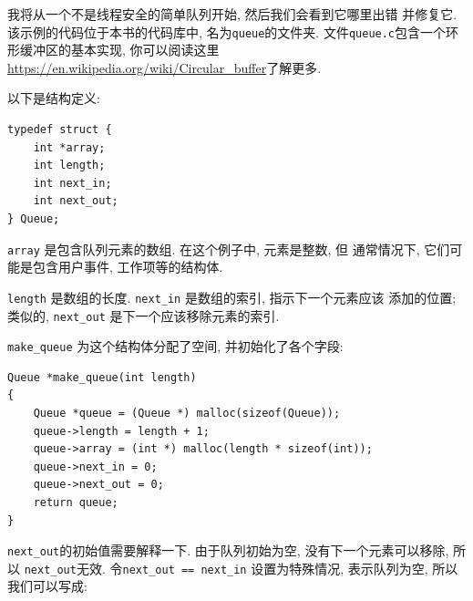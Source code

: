 \documentclass[12pt]{book}
\begin{document}
{我将从一个不是线程安全的简单队列开始, 然后我们会看到它哪里出错
并修复它. 该示例的代码位于本书的代码库中, 名为{\tt queue}的文件夹.
文件{\tt queue.c}包含一个环形缓冲区的基本实现, 你可以阅读这里\url{https://en.wikipedia.org/wiki/Circular_buffer}了解更多.

以下是结构定义: 

\begin{verbatim}
typedef struct {
    int *array;
    int length;
    int next_in;
    int next_out;
} Queue;
\end{verbatim}

{\tt array} 是包含队列元素的数组. 在这个例子中, 元素是整数, 但
通常情况下, 它们可能是包含用户事件, 工作项等的结构体.

{\tt length} 是数组的长度. \verb"next_in" 是数组的索引, 指示下一个元素应该
添加的位置; 类似的, \verb"next_out" 是下一个应该移除元素的索引.

\verb"make_queue" 为这个结构体分配了空间, 并初始化了各个字段:

\begin{verbatim}
Queue *make_queue(int length)
{
    Queue *queue = (Queue *) malloc(sizeof(Queue));
    queue->length = length + 1;
    queue->array = (int *) malloc(length * sizeof(int));
    queue->next_in = 0;
    queue->next_out = 0;
    return queue;
}
\end{verbatim}

\verb"next_out"的初始值需要解释一下. 
由于队列初始为空, 没有下一个元素可以移除, 
所以 \verb"next_out"无效.  令\verb"next_out == next_in"
设置为特殊情况, 表示队列为空, 所以我们可以写成:

}
\end{document}

